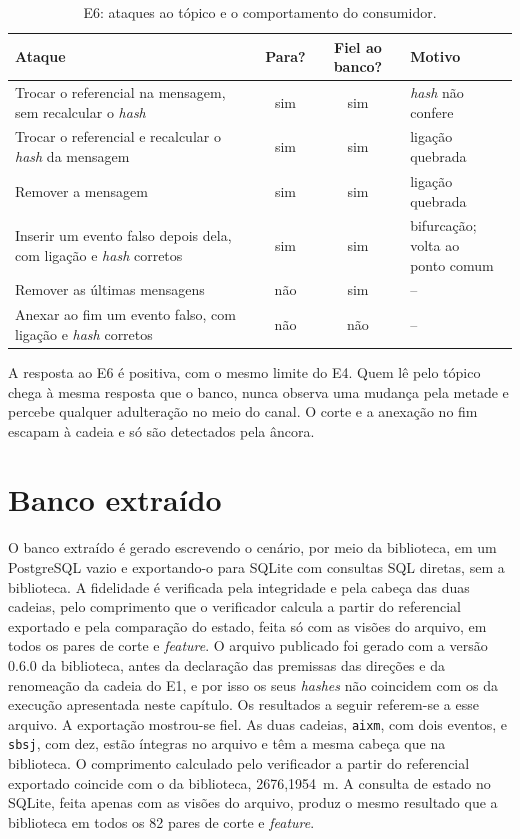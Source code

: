 \begin{table}[htbp]
    \centering
    \caption{E6: ataques ao tópico e o comportamento do consumidor.}
    \label{tab:res-e6}
    \begin{tabularx}{\linewidth}{X c c l}
        \toprule
        Ataque & Para? & Fiel ao banco? & Motivo \\
        \midrule
        Trocar o referencial na mensagem, sem recalcular o \textit{hash} & sim & sim & \textit{hash} não confere \\
        Trocar o referencial e recalcular o \textit{hash} da mensagem & sim & sim & ligação quebrada \\
        Remover a mensagem & sim & sim & ligação quebrada \\
        Inserir um evento falso depois dela, com ligação e \textit{hash} corretos & sim & sim & \makecell[l]{bifurcação; volta ao\\ ponto comum} \\
        Remover as últimas mensagens & não & sim & -- \\
        Anexar ao fim um evento falso, com ligação e \textit{hash} corretos & não & não & -- \\
        \bottomrule
    \end{tabularx}
    \par{}
\end{table}

A resposta ao E6 é positiva, com o mesmo limite do E4. Quem lê pelo tópico chega à mesma resposta que o banco, nunca observa uma mudança pela metade e percebe qualquer adulteração no meio do canal. O corte e a anexação no fim escapam à cadeia e só são detectados pela âncora.

\section{Banco extraído}\label{sec:res-banco}

O banco extraído é gerado escrevendo o cenário, por meio da biblioteca, em um PostgreSQL vazio e exportando-o para SQLite com consultas SQL diretas, sem a biblioteca. A fidelidade é verificada pela integridade e pela cabeça das duas cadeias, pelo comprimento que o verificador calcula a partir do referencial exportado e pela comparação do estado, feita só com as visões do arquivo, em todos os pares de corte e \textit{feature}. O arquivo publicado foi gerado com a versão 0.6.0 da biblioteca, antes da declaração das premissas das direções e da renomeação da cadeia do E1, e por isso os seus \textit{hashes} não coincidem com os da execução apresentada neste capítulo. Os resultados a seguir referem-se a esse arquivo. A exportação mostrou-se fiel. As duas cadeias, \texttt{aixm}, com dois eventos, e \texttt{sbsj}, com dez, estão íntegras no arquivo e têm a mesma cabeça que na biblioteca. O comprimento calculado pelo verificador a partir do referencial exportado coincide com o da biblioteca, 2676,1954~m. A consulta de estado no SQLite, feita apenas com as visões do arquivo, produz o mesmo resultado que a biblioteca em todos os 82 pares de corte e \textit{feature}.

